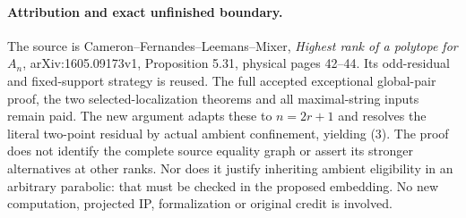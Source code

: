 \documentclass[11pt,a4paper]{article}
\begin{document}
\paragraph{Attribution and exact unfinished boundary.}
The source is Cameron--Fernandes--Leemans--Mixer,
\emph{Highest rank of a polytope for $A_n$}, arXiv:1605.09173v1,
Proposition 5.31, physical pages 42--44. Its odd-residual and
fixed-support strategy is reused. The full accepted exceptional
 global-pair proof, the two selected-localization theorems and all
maximal-string inputs remain paid. The new argument adapts these to
$n=2r+1$ and resolves the literal two-point residual by actual
ambient confinement, yielding (3).
The proof does not identify the complete source equality graph or
assert its stronger alternatives at other ranks. Nor does it justify
inheriting ambient eligibility in an arbitrary parabolic: that must
be checked in the proposed embedding. No new computation, projected
IP, formalization or original credit is involved.
\end{document}
